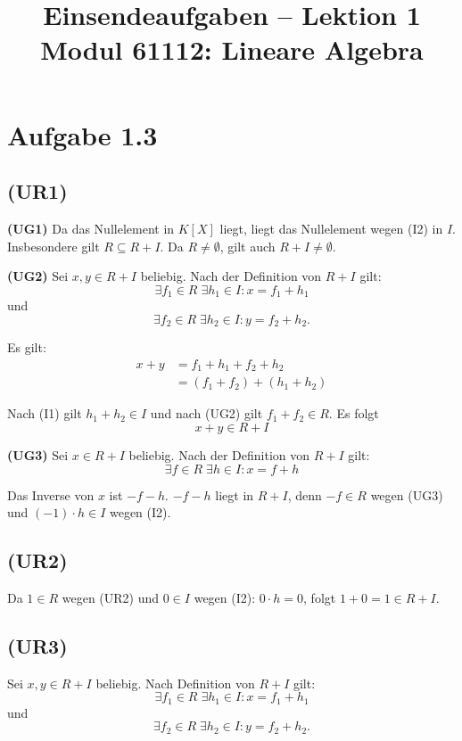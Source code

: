 \documentclass[a4paper,12pt]{article}
\title{Einsendeaufgaben -- Lektion 1\\[0.5em]
\large Modul 61112: Lineare Algebra}
\author{}
\date{}
\begin{document}
\maketitle

\section*{Aufgabe 1.3}

\subsection*{(UR1)}

\textbf{(UG1)} Da das Nullelement in $K[X]$ liegt, liegt das Nullelement wegen (I2) in $I$.
Insbesondere gilt $R \subseteq R + I$. Da $R \neq \emptyset$, gilt auch $R + I \neq \emptyset$.

\bigskip

\textbf{(UG2)} Sei $x, y \in R + I$ beliebig. Nach der Definition von $R + I$ gilt:
\[
  \exists f_1 \in R\; \exists h_1 \in I \colon x = f_1 + h_1
\]
und
\[
  \exists f_2 \in R\; \exists h_2 \in I \colon y = f_2 + h_2.
\]

Es gilt:
\begin{align*}
  x + y &= f_1 + h_1 + f_2 + h_2 \\
        &= (f_1 + f_2) + (h_1 + h_2)
\end{align*}

Nach (I1) gilt $h_1 + h_2 \in I$ und nach (UG2) gilt $f_1 + f_2 \in R$. Es folgt
\[
  x + y \in R + I
\]

\bigskip

\textbf{(UG3)} Sei $x \in R + I$ beliebig. Nach der Definition von $R + I$ gilt:
\[
  \exists f \in R\; \exists h \in I \colon x = f + h
\]

Das Inverse von $x$ ist $-f - h$.
$-f - h$ liegt in $R + I$, denn $-f \in R$ wegen (UG3) und $(-1) \cdot h \in I$ wegen (I2).

\subsection*{(UR2)}

Da $1 \in R$ wegen (UR2) und $0 \in I$ wegen (I2): $0 \cdot h = 0$,
folgt $1 + 0 = 1 \in R + I$.

\subsection*{(UR3)}

Sei $x, y \in R + I$ beliebig. Nach Definition von $R + I$ gilt:
\[
  \exists f_1 \in R\; \exists h_1 \in I \colon x = f_1 + h_1
\]
und
\[
  \exists f_2 \in R\; \exists h_2 \in I \colon y = f_2 + h_2.
\]
\end{document}
